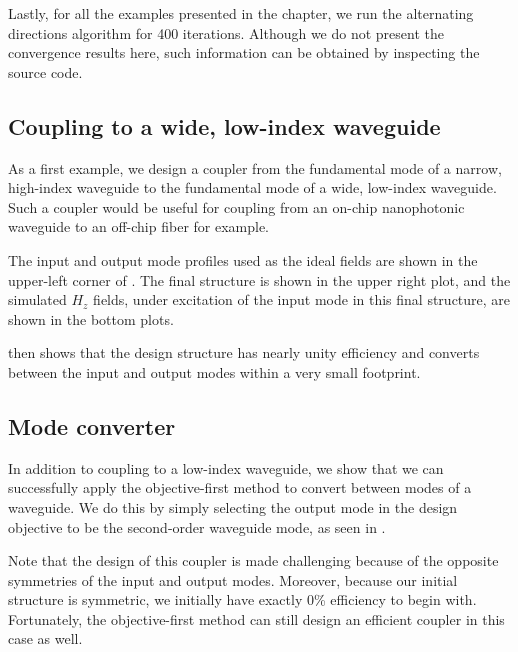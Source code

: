 Lastly, for all the examples presented in the chapter,
    we run the alternating directions algorithm for 400 iterations.
Although we do not present the convergence results here,
    such information can be obtained by inspecting the source code\cite{code}.

\subsection{Coupling to a wide, low-index waveguide}
As a first example, we design a coupler from 
    the fundamental mode of a narrow, high-index waveguide
    to the fundamental mode of a wide, low-index waveguide.
Such a coupler would be useful for coupling from 
    an on-chip nanophotonic waveguide to
    an off-chip fiber for example.


The input and output mode profiles used as
    the ideal fields are shown in the upper-left corner of .
The final structure is shown in the upper right plot, and
    the simulated $H_z$ fields,
    under excitation of the input mode in this final structure,
    are shown in the bottom plots.

 then shows that the design structure has nearly unity efficiency
    and converts between the input and output modes
    within a very small footprint.

\subsection{Mode converter}
In addition to coupling to a low-index waveguide,
    we show that we can successfully apply the objective-first method
    to convert between modes of a waveguide.
We do this by simply selecting the output mode 
    in the design objective to be the second-order waveguide mode,
    as seen in .

Note that the design of this coupler is made challenging
    because of the opposite symmetries of the input and output modes.
Moreover, because our initial structure is symmetric,
    we initially have exactly 0\% efficiency to begin with.
Fortunately, the objective-first method can still design
    an efficient coupler in this case as well.

